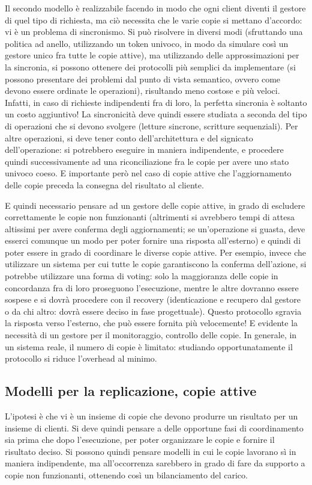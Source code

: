Il secondo modello è realizzabile facendo in modo che ogni client diventi il gestore di quel tipo di richiesta, ma 
ciò necessita che le varie copie si mettano d'accordo: vi è un problema di sincronismo. Si può risolvere in diversi
modi (sfruttando una politica ad anello, utilizzando un token univoco, in modo da simulare così un gestore unico fra
tutte le copie attive), ma utilizzando delle approssimazioni per la sincronia, si possono ottenere dei protocolli più
semplici da implementare (si possono presentare dei problemi dal punto di vista semantico, ovvero come devono essere
ordinate le operazioni), risultando meno costose e più veloci. Infatti, in caso di richieste indipendenti fra di loro,
la perfetta sincronia è soltanto un costo aggiuntivo! La sincronicità deve quindi essere studiata a seconda del tipo di
operazioni che si devono svolgere (letture sincrone, scritture sequenziali). Per altre operazioni, si deve tener conto
dell'architettura e del signicato dell'operazione: si potrebbero eseguire in maniera indipendente, e procedere quindi
successivamente ad una riconciliazione fra le copie per avere uno stato univoco coeso. E importante però nel caso di
copie attive che l'aggiornamento delle copie preceda la consegna del risultato al cliente.

E quindi necessario pensare ad un gestore delle copie attive, in grado di escludere correttamente le copie non
funzionanti (altrimenti si avrebbero tempi di attesa altissimi per avere conferma degli aggiornamenti; se un'operazione
si guasta, deve esserci comunque un modo per poter fornire una risposta all'esterno) e quindi di poter essere in grado
di coordinare le diverse copie attive. Per esempio, invece che utilizzare un sistema per cui tutte le copie garantiscono
la conferma dell'azione, si potrebbe utilizzare una forma di voting: solo la maggioranza delle copie in concordanza fra
di loro proseguono l'esecuzione, mentre le altre dovranno essere sospese e si dovrà procedere con il recovery
(identicazione e recupero dal gestore o da chi altro: dovrà essere deciso in fase progettuale).
Questo protocollo sgravia la risposta verso l'esterno, che può essere fornita più velocemente! E evidente la necessità
di un gestore per il monitoraggio, controllo delle copie. In generale, in un sistema reale, il numero di copie è
limitato: studiando opportunatamente il protocollo si riduce l'overhead al minimo.
\subsection{Modelli per la replicazione, copie attive}
L'ipotesi è che vi è un insieme di copie che devono produrre un risultato per un insieme di clienti. Si deve quindi
pensare a delle opportune fasi di coordinamento sia prima che dopo l'esecuzione, per poter organizzare le copie e
fornire il risultato deciso. Si possono quindi pensare modelli in cui le copie lavorano sì in maniera indipendente,
ma all'occorrenza sarebbero in grado di fare da supporto a copie non funzionanti, ottenendo così un bilanciamento del
carico.

